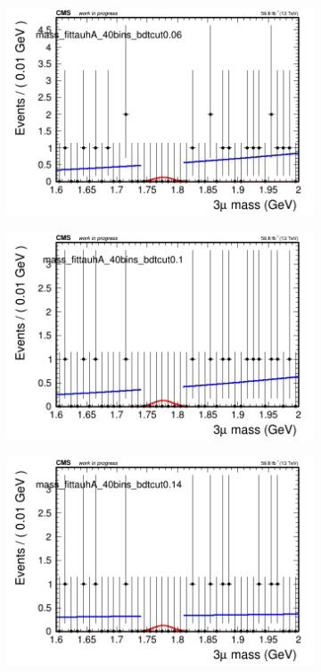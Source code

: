 \begin{figure}[H]
\begin{subfigure}{0.2\textwidth}
        \includegraphics[width=\textwidth]{power_law/plots/tauhA/massfit_tauhA_40bins_bdtcut0.06.png}
        \caption{}
    \end{subfigure}
    \begin{subfigure}{0.2\textwidth}
        \includegraphics[width=\textwidth]{power_law/plots/tauhA/massfit_tauhA_40bins_bdtcut0.1.png}
        \caption{}
    \end{subfigure}
    \begin{subfigure}{0.2\textwidth}
        \includegraphics[width=\textwidth]{power_law/plots/tauhA/massfit_tauhA_40bins_bdtcut0.14.png}

\end{subfigure}
\end{figure}
